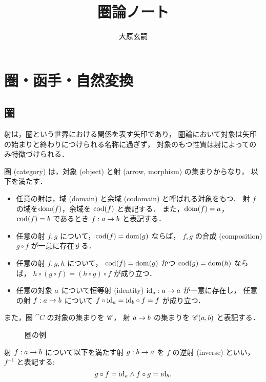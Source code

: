 \documentclass[titlepage]{ltjsreport}
\title{圏論ノート}
\author{大原玄嗣}
\begin{document}
\maketitle
\tableofcontents

\chapter{圏・函手・自然変換}

\section{圏}

射は，圏という世界における関係を表す矢印であり，
圏論において対象は矢印の始まりと終わりにつけられる名称に過ぎず，
対象のもつ性質は射によってのみ特徴づけられる．

\begin{definition}[圏]\label{def:category}
  \def\a{\obj{a}}%
  \def\b{\obj{b}}%
  圏 (category) は，対象 (object) と射 (arrow, morphism) の集まりからなり，
  以下を満たす．
  \begin{itemize}
    \item 任意の射は，域 (domain) と余域 (codomain) と呼ばれる対象をもつ．
          射 $f$ の域を$\operatorname{dom}(f)$，余域を $\operatorname{cod}(f)$ と表記する．
          また，$\dom(f)=\a$，$\cod(f)=\b$ であるとき
          $\mrp{f}{\a}{\b}$ と表記する．
    \item 任意の射 $f,g$ について，$\operatorname{cod}(f)=\operatorname{dom}(g)$ ならば，
          $f,g$ の合成 (composition) $g\circ f$ が一意に存在する．
    \item 任意の射 $f,g,h$ について，
          $\operatorname{cod}(f)=\operatorname{dom}(g)$ かつ $\operatorname{cod}(g)=\operatorname{dom}(h)$ ならば，
          $h\circ(g\circ f)=(h\circ g)\circ f$ が成り立つ．
    \item 任意の対象 $\a$ について恒等射 (identity)
          $\mrp{\id{\a}}{\a}{\a}$ が一意に存在し，
          任意の射 $\mrp{f}{\a}{\b}$ について
          $f\circ\id{\a}=\id{\b}\circ f=f$ が成り立つ．
  \end{itemize}
  また，圏 $\cat{C}$ の対象の集まりを $\mathscr{C}$，
  射 $\a\to\b$ の集まりを $\mrps{\cat{C}}{\a}{\b}$ と表記する．
\end{definition}

\begin{figure}[htbp]
  \centering
  
  \caption{圏の例}
\end{figure}

\begin{definition}[逆射]
  \def\a{\obj{a}}%
  \def\b{\obj{b}}%
  射 $\mrp{f}{\a}{\b}$ について以下を満たす射 $\mrp{g}{\b}{\a}$ を
  $f$ の逆射 (inverse) といい，
  $f^{-1}$ と表記する:
  \begin{equation}
    g\circ f=\id{\a}\wedge f\circ g=\id{\b}.
  \end{equation}
\end{definition}
\end{document}
